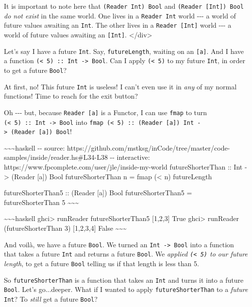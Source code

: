 \documentclass[]{article}
\begin{document}
It is important to note here that \texttt{(Reader\ Int)\ Bool} and
\texttt{(Reader\ {[}Int{]})\ Bool} \emph{do not exist} in the same world. One
lives in a \texttt{Reader\ Int} world -\/-\/- a world of future values awaiting
an \texttt{Int}. The other lives in a \texttt{Reader\ {[}Int{]}} world -\/-\/- a
world of future values awaiting an \texttt{{[}Int{]}}.
\textless{}/div\textgreater{}

Let's say I have a future \texttt{Int}. Say, \texttt{futureLength}, waiting on
an \texttt{{[}a{]}}. And I have a function
\texttt{(\textless{}\ 5)\ ::\ Int\ -\textgreater{}\ Bool}. Can I apply
\texttt{(\textless{}\ 5)} to my future \texttt{Int}, in order to get a future
\texttt{Bool}?

At first, no! This future \texttt{Int} is useless! I can't even use it in
\emph{any} of my normal functions! Time to reach for the exit button?

Oh -\/-\/- but, because \texttt{Reader\ {[}a{]}} is a Functor, I can use
\texttt{fmap} to turn \texttt{(\textless{}\ 5)\ ::\ Int\ -\textgreater{}\ Bool}
into
\texttt{fmap\ (\textless{}\ 5)\ ::\ (Reader\ {[}a{]})\ Int\ -\textgreater{}\ (Reader\ {[}a{]})\ Bool}!

\textasciitilde{}\textasciitilde{}\textasciitilde{}haskell -\/- source:
https://github.com/mstksg/inCode/tree/master/code-samples/inside/reader.hs\#L34-L38
-\/- interactive: https://www.fpcomplete.com/user/jle/inside-my-world
futureShorterThan :: Int -\textgreater{} (Reader {[}a{]}) Bool futureShorterThan
n = fmap (\textless{} n) futureLength

futureShorterThan5 :: (Reader {[}a{]}) Bool futureShorterThan5 =
futureShorterThan 5 \textasciitilde{}\textasciitilde{}\textasciitilde{}

\textasciitilde{}\textasciitilde{}\textasciitilde{}haskell ghci\textgreater{}
runReader futureShorterThan5 {[}1,2,3{]} True ghci\textgreater{} runReader
(futureShorterThan 3) {[}1,2,3,4{]} False
\textasciitilde{}\textasciitilde{}\textasciitilde{}

And voilà, we have a future \texttt{Bool}. We turned an
\texttt{Int\ -\textgreater{}\ Bool} into a function that takes a future
\texttt{Int} and returns a future \texttt{Bool}. We \emph{applied
\texttt{(\textless{}\ 5)} to our future length}, to get a future \texttt{Bool}
telling us if that length is less than 5.

So \texttt{futureShorterThan} is a function that takes an \texttt{Int} and turns
it into a future \texttt{Bool}. Let's go...deeper. What if I wanted to apply
\texttt{futureShorterThan} to a \emph{future} \texttt{Int}? To \emph{still} get
a future \texttt{Bool}?
\end{document}
